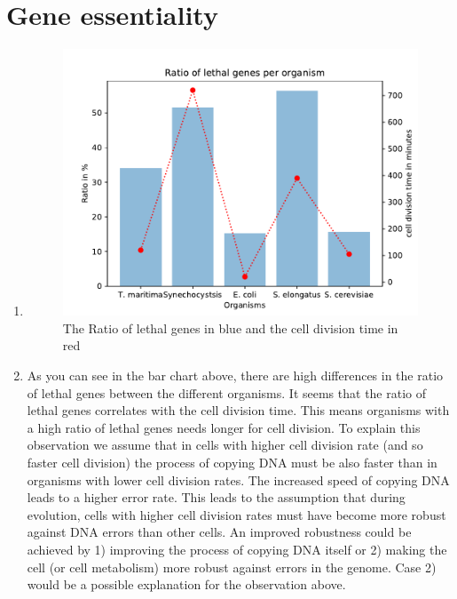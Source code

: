 \documentclass{scrartcl}
\begin{document}
\begin{enumerate}
\def\barplot#1#2{\tikz[baseline,x=0.016666\linewidth,y=0.016666\linewidth]{\draw[|-|,thick](#1,0) -- (#2,0); \path(-25,0) -- (35,0);}}
\def\bardot#1#2{\tikz[baseline,x=0.016666\linewidth,y=0.016666\linewidth]{\fill (#1,0) circle (0.25ex);  \path(-25,0) -- (35,0);}}
\begin{longtable}{p{0.2\linewidth}p{0.8\linewidth}}

\end{longtable}
\end{enumerate}
\section{Gene essentiality}
\begin{enumerate}
	\item 
	\begin{figure}[H]
		\centering
		\includegraphics[max width=\linewidth]{Figure_question4.pdf}
		\caption{The Ratio of lethal genes in blue and the cell division time in red}
	\end{figure}
	\item As you can see in the bar chart above, there are high differences in the ratio of lethal genes between the different organisms. It seems that the ratio of lethal genes correlates with the cell division time. This means organisms with a high ratio of lethal genes needs longer for cell division.
		To explain this observation we assume that in cells with higher cell division rate (and so faster cell division) the process of copying DNA must be also faster than in organisms with lower cell division rates. The increased speed of copying DNA leads to a higher error rate. This leads to the assumption that during evolution, cells with higher cell division rates must have become more robust against DNA errors than other cells. An improved robustness could be achieved by 1) improving the process of copying DNA itself or 2) making the cell (or cell metabolism) more robust against errors in the genome. Case 2) would be a possible explanation for the observation above.
\end{enumerate}
\end{document}
